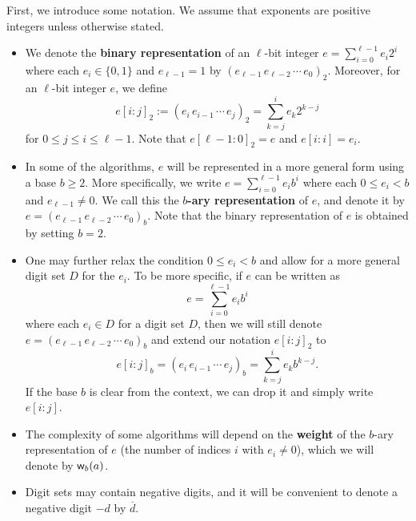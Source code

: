 First, we introduce some notation. We assume that exponents are positive integers unless 
otherwise stated. 
\begin{itemize}
    \item We denote the {\bf binary representation} of an $\ell$-bit integer $e = \sum_{i=0}^{\ell-1} e_i 2^i$
    where each $e_i \in \{0, 1\}$ and $e_{\ell-1} = 1$ by $(e_{\ell-1}\,e_{\ell-2}\,\cdots\,e_0)_2$. 
    Moreover, for an $\ell$-bit integer $e$, we define 
    \[ e[i : j]_2 := (e_i\,e_{i-1}\,\cdots\,e_j)_2 = \sum_{k=j}^i e_k 2^{k-j} \]
    for $0 \leq j \leq i \leq \ell-1$. Note that $e[\ell-1 : 0]_2 = e$ and $e[i : i] = e_i$.
    \item In some of the algorithms, $e$ will be represented in a more general form using a base 
    $b \geq 2$. More specifically, we write $e = \sum_{i=0}^{\ell-1} e_i b^i$ where each 
    $0 \leq e_i < b$ and $e_{\ell-1} \neq 0$. We call this the 
    {\bf $b$-ary representation} of $e$, and denote it by $e = (e_{\ell-1}\,e_{\ell-2}\,\cdots\,e_0)_b$.
    Note that the binary representation of $e$ is obtained by setting $b = 2$. 
    \item One may further relax the condition $0 \leq e_i < b$ and allow for a more general 
    digit set $D$ for the $e_i$. To be more specific, if $e$ can be written as 
    \[ e = \sum_{i=0}^{\ell-1} e_i b^i \]
    where each $e_i \in D$ for a digit set $D$, then we will still denote $e = (e_{\ell-1}\,e_{\ell-2}\,\cdots\,e_0)_b$ and extend our notation $e[i : j]_2$ to 
    \[ e[i : j]_b = (e_i\,e_{i-1}\,\cdots\,e_j)_b = \sum_{k=j}^i e_k b^{k-j}. \]
    If the base $b$ is clear from the context, we can drop it and simply write $e[i : j]$. 
    \item The complexity of some algorithms will depend on the {\bf weight} of the $b$-ary 
    representation of $e$ (the number of indices $i$ with $e_i \neq 0$), which we will denote by 
    ${\sf w}_b(a)$. 
    \item Digit sets may contain negative digits, and it will be convenient to denote a negative 
    digit $-d$ by $\overline{d}$. 
\end{itemize}

